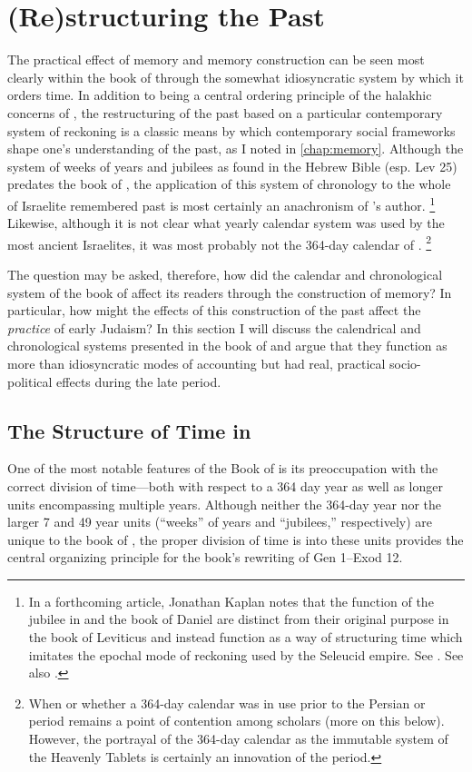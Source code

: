 \section{(Re)structuring the Past}
The practical effect of memory and memory construction can be seen most clearly within the book of \jub through the somewhat idiosyncratic system by which it orders time. In addition to being a central ordering principle of the halakhic concerns of \jub, the restructuring of the past based on a particular contemporary system of reckoning is a classic means by which contemporary social frameworks shape one's understanding of the past, as I noted in \autoref{chap:memory}. Although the system of weeks of years and jubilees as found in the Hebrew Bible (esp. Lev 25) predates the book of \jub, the application of this system of chronology to the whole of Israelite remembered past is most certainly an anachronism of \jub's author.%
    \footnote{In a forthcoming article, Jonathan Kaplan notes that the function of the jubilee in \jub and the book of Daniel are distinct from their original purpose in the book of Leviticus and instead function as a way of structuring time which imitates the epochal mode of reckoning used by the Seleucid empire. See \cite{kaplan_jaj2019}. See also \cite[137--186]{kosmin2018}.}
Likewise, although it is not clear what yearly calendar system was used by the most ancient Israelites, it was most probably not the 364-day calendar of \jub.%
    \footnote{When or whether a 364-day calendar was in use prior to the Persian or \secondtemple period remains a point of contention among scholars (more on this below). However, the portrayal of the 364-day calendar as the immutable system of the Heavenly Tablets is certainly an innovation of the \secondtemple period.}

The question may be asked, therefore, how did the calendar and chronological system of the book of \jub affect its readers through the construction of memory? In particular, how might the effects of this construction of the past affect the \emph{practice} of early Judaism? In this section I will discuss the calendrical and chronological systems presented in the book of \jub and argue that they function as more than idiosyncratic modes of accounting but had real, practical socio-political effects during the late \secondtemple period.

\subsection{The Structure of Time in \jub}
One of the most notable features of the Book of \jub is its preoccupation with the correct division of time---both with respect to a 364 day year as well as longer units encompassing multiple years. Although neither the 364-day year nor the larger 7 and 49 year units (``weeks'' of years and ``jubilees,'' respectively) are unique to the book of \jub, the proper division of time is into these units provides the central organizing principle for the book's rewriting of Gen 1--Exod 12.

